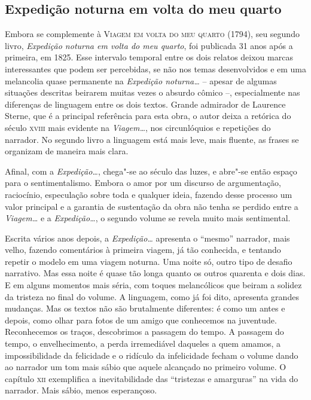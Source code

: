 \subsection{Expedição noturna em volta do meu quarto}

Embora se complemente à \textsc{Viagem em volta do meu quarto} (1794), seu segundo livro, \textit{Expedição noturna em volta do meu quarto}, foi publicada 31 anos após a primeira, em 1825. Esse intervalo temporal
entre os dois relatos deixou marcas interessantes que podem ser
percebidas, se não nos temas desenvolvidos e em uma melancolia quase
permanente na \textit{Expedição noturna\ldots} -- apesar de algumas
situações descritas beirarem muitas vezes o absurdo cômico --,
especialmente nas diferenças de linguagem entre os dois textos. Grande
admirador de Laurence Sterne, que é a principal referência para esta
obra, o autor deixa a retórica do século \textsc{xviii} mais evidente na
\textit{Viagem\ldots}, nos circunlóquios e repetições do narrador. No
segundo livro a linguagem está mais leve, mais fluente, as frases se
organizam de maneira mais clara.

Afinal, com a \textit{Expedição\ldots}, chega"-se ao século das luzes, e abre"-se então espaço para o sentimentalismo. Embora o
amor por um discurso de argumentação, raciocínio, especulação sobre
toda e qualquer ideia, fazendo desse processo um valor principal e a
garantia de sustentação da obra não tenha se perdido entre a
\textit{Viagem\ldots} e a \textit{Expedição\ldots},  o segundo volume se
revela muito mais sentimental.

Escrita vários anos depois, a \textit{Expedição\ldots} apresenta o ``mesmo''
narrador, mais velho, fazendo comentários à primeira viagem, já tão
conhecida, e tentando repetir o modelo em uma viagem noturna. Uma noite
só, outro tipo de desafio narrativo. Mas essa noite é quase tão longa
quanto os outros quarenta e dois dias. E em alguns momentos mais séria,
com toques melancólicos que beiram a solidez da tristeza no final do
volume. A linguagem, como já foi dito, apresenta grandes mudanças. Mas
os textos não são brutalmente diferentes: é como um antes e depois,
como olhar para fotos de um amigo que conhecemos na juventude.
Reconhecemos os traços, descobrimos a passagem do tempo. A passagem do
tempo, o envelhecimento, a perda irremediável daqueles a quem amamos, a
impossibilidade da felicidade e o ridículo da infelicidade fecham o
volume dando ao narrador um tom mais sábio que aquele alcançado no
primeiro volume. O capítulo \textsc{xii} exemplifica a inevitabilidade das
``tristezas e amarguras'' na vida do narrador. Mais sábio, menos
esperançoso. 

